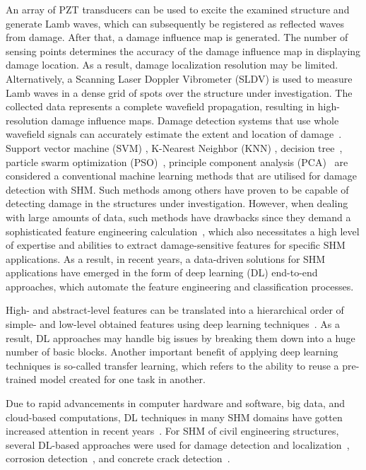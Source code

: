 An array of PZT transducers can be used to excite the examined structure and generate Lamb waves, which can subsequently be registered as reflected waves from damage.
After that, a damage influence map is generated.
The number of sensing points determines the accuracy of the damage influence map in displaying damage location.
As a result, damage localization resolution may be limited.
Alternatively, a Scanning Laser Doppler Vibrometer (SLDV) is used to measure Lamb waves in a dense grid of spots over the structure under investigation.
The collected data represents a complete wavefield propagation, resulting in high-resolution damage influence maps.
Damage detection systems that use whole wavefield signals can accurately estimate the extent and location of damage~\cite{Girolamo2018a, kudela2018impact}.
\\
Support vector machine (SVM) \cite{noori2010application, Khoa2014, Ghiasi2016}, K-Nearest Neighbor (KNN) \cite{Vitola2017}, decision tree~\cite{Mariniello2020}, particle swarm optimization (PSO)~\cite{Khatir2018, NouriShirazi2014}, principle component analysis (PCA)~\cite{wang2014principal, nguyen2010fault, liu2014research} are considered a conventional machine learning methods that are utilised for damage detection with SHM.
Such methods among others have proven to be capable of detecting damage in the structures under investigation.
However, when dealing with large amounts of data, such methods have drawbacks since they demand a sophisticated feature engineering calculation~\cite{Gulgec2019}, which also necessitates a high level of expertise and abilities to extract damage-sensitive features for specific SHM applications.
As a result, in recent years, a data-driven solutions for SHM applications have emerged in the form of deep learning (DL) end-to-end approaches, which automate the feature engineering and classification processes.

High- and abstract-level features can be translated into a hierarchical order of simple- and low-level obtained features using deep learning techniques~\cite{goodfellow2016deep}.
As a result, DL approaches may handle big issues by breaking them down into a huge number of basic blocks.
Another important benefit of applying deep learning techniques is so-called transfer learning, which refers to the ability to reuse a pre-trained model created for one task in another.

Due to rapid advancements in computer hardware and software, big data, and cloud-based computations, DL techniques in many SHM domains have gotten increased attention in recent years~\cite{Azimi}.
For SHM of civil engineering structures, several DL-based approaches were used for damage detection and localization~\cite{Cha2018, Kong2018}, corrosion detection~\cite{Atha2018}, and concrete crack detection~\cite{Dung2019}.

